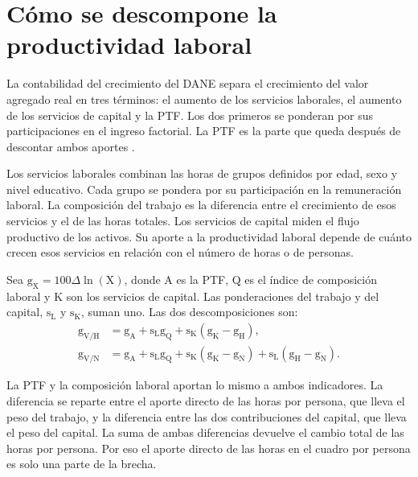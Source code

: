 \clearpage
\section{Cómo se descompone la productividad laboral}

La contabilidad del crecimiento del DANE separa el crecimiento del valor agregado real en tres términos: el aumento de los servicios laborales, el aumento de los servicios de capital y la PTF. Los dos primeros se ponderan por sus participaciones en el ingreso factorial. La PTF es la parte que queda después de descontar ambos aportes \citep{daneMet,daneBol}.

Los servicios laborales combinan las horas de grupos definidos por edad, sexo y nivel educativo. Cada grupo se pondera por su participación en la remuneración laboral. La composición del trabajo es la diferencia entre el crecimiento de esos servicios y el de las horas totales. Los servicios de capital miden el flujo productivo de los activos. Su aporte a la productividad laboral depende de cuánto crecen esos servicios en relación con el número de horas o de personas.

Sea \(\mathrm{g}_{\mathrm{X}}=100\Delta\ln(\mathrm{X})\), donde \(\mathrm{A}\) es la PTF, \(\mathrm{Q}\) es el índice de composición laboral y \(\mathrm{K}\) son los servicios de capital. Las ponderaciones del trabajo y del capital, \(\mathrm{s}_{\mathrm{L}}\) y \(\mathrm{s}_{\mathrm{K}}\), suman uno. Las dos descomposiciones son:
\begin{align*}
\mathrm{g}_{\mathrm{V}/\mathrm{H}} &=
\mathrm{g}_{\mathrm{A}} + \mathrm{s}_{\mathrm{L}}\mathrm{g}_{\mathrm{Q}} +
\mathrm{s}_{\mathrm{K}}(\mathrm{g}_{\mathrm{K}}-\mathrm{g}_{\mathrm{H}}),\\
\mathrm{g}_{\mathrm{V}/\mathrm{N}} &=
\mathrm{g}_{\mathrm{A}} + \mathrm{s}_{\mathrm{L}}\mathrm{g}_{\mathrm{Q}} +
\mathrm{s}_{\mathrm{K}}(\mathrm{g}_{\mathrm{K}}-\mathrm{g}_{\mathrm{N}}) +
\mathrm{s}_{\mathrm{L}}(\mathrm{g}_{\mathrm{H}}-\mathrm{g}_{\mathrm{N}}).
\end{align*}

La PTF y la composición laboral aportan lo mismo a ambos indicadores. La diferencia se reparte entre el aporte directo de las horas por persona, que lleva el peso del trabajo, y la diferencia entre las dos contribuciones del capital, que lleva el peso del capital. La suma de ambas diferencias devuelve el cambio total de las horas por persona. Por eso el aporte directo de las horas en el cuadro por persona es solo una parte de la brecha.

